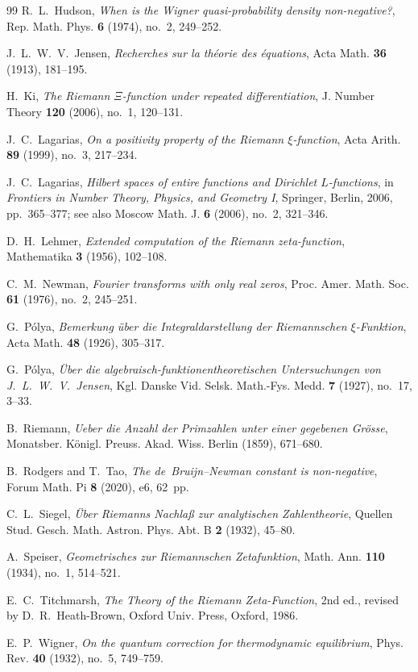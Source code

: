 \documentclass[11pt,reqno]{amsart}
\theoremstyle{definition}
\theoremstyle{remark}
\numberwithin{equation}{section}
\begin{document}
\begin{thebibliography}{99}
R.~L.~Hudson,
\emph{When is the Wigner quasi-probability density non-negative?},
Rep. Math. Phys. \textbf{6} (1974), no.~2, 249--252.

J.~L.~W.~V.~Jensen,
\emph{Recherches sur la th\'eorie des \'equations},
Acta Math. \textbf{36} (1913), 181--195.

H.~Ki,
\emph{The Riemann $\Xi$-function under repeated differentiation},
J. Number Theory \textbf{120} (2006), no.~1, 120--131.

J.~C.~Lagarias,
\emph{On a positivity property of the Riemann $\xi$-function},
Acta Arith. \textbf{89} (1999), no.~3, 217--234.

J.~C.~Lagarias,
\emph{Hilbert spaces of entire functions and Dirichlet $L$-functions},
in \emph{Frontiers in Number Theory, Physics, and Geometry I}, Springer, Berlin, 2006, pp.~365--377; see also Moscow Math. J. \textbf{6} (2006), no.~2, 321--346.

D.~H.~Lehmer,
\emph{Extended computation of the Riemann zeta-function},
Mathematika \textbf{3} (1956), 102--108.

C.~M.~Newman,
\emph{Fourier transforms with only real zeros},
Proc. Amer. Math. Soc. \textbf{61} (1976), no.~2, 245--251.

G.~P\'olya,
\emph{Bemerkung \"uber die Integraldarstellung der Riemannschen $\xi$-Funktion},
Acta Math. \textbf{48} (1926), 305--317.

G.~P\'olya,
\emph{\"Uber die algebraisch-funktionentheoretischen Untersuchungen von J.~L.~W.~V.~Jensen},
Kgl. Danske Vid. Selsk. Math.-Fys. Medd. \textbf{7} (1927), no.~17, 3--33.

B.~Riemann,
\emph{Ueber die Anzahl der Primzahlen unter einer gegebenen Gr\"osse},
Monatsber. K\"onigl. Preuss. Akad. Wiss. Berlin (1859), 671--680.

B.~Rodgers and T.~Tao,
\emph{The de~Bruijn--Newman constant is non-negative},
Forum Math. Pi \textbf{8} (2020), e6, 62~pp.

C.~L.~Siegel,
\emph{\"Uber Riemanns Nachla\ss{} zur analytischen Zahlentheorie},
Quellen Stud. Gesch. Math. Astron. Phys. Abt. B \textbf{2} (1932), 45--80.

A.~Speiser,
\emph{Geometrisches zur Riemannschen Zetafunktion},
Math. Ann. \textbf{110} (1934), no.~1, 514--521.

E.~C.~Titchmarsh,
\emph{The Theory of the Riemann Zeta-Function},
2nd ed., revised by D.~R.~Heath-Brown, Oxford Univ. Press, Oxford, 1986.

E.~P.~Wigner,
\emph{On the quantum correction for thermodynamic equilibrium},
Phys. Rev. \textbf{40} (1932), no.~5, 749--759.

\end{thebibliography}
\end{document}
